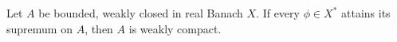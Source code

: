 Let $A$ be bounded, weakly closed in real Banach $X$. If every $\phi\in X^*$ attains its supremum on $A$, then $A$ is weakly compact.
